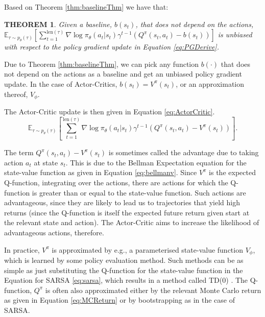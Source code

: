 \documentclass{report}
\newtheorem{theorem}{THEOREM}
\numberwithin{equation}{section}
\numberwithin{figure}{section}
\numberwithin{table}{section}
\numberwithin{algorithm}{section}
\begin{document}
Based on Theorem \ref{thm:baselineThm} we have that:
\begin{theorem}\label{thm:unbiasedBaseline}
  Given a baseline, $b(s_t)$, that does not depend on the actions,\\
  $\mathbb{E}_{\tau\sim p_\theta(\tau)}\left[\sum_{t=1}^{\text{len}(\tau)}\nabla \log \pi_\theta(a_t|s_t)
  \gamma^{t-1}\left(Q^{\pi}(s_t, a_t)-b(s_t)\right)\right]$ is unbiased with respect 
  to the policy gradient update in Equation \ref{eq:PGDerive}.
\end{theorem}
Due to Theorem \ref{thm:baselineThm}, we can pick any function 
$b(\cdot)$ that does not depend on the actions as a baseline and 
get an unbiased policy gradient update. In the case of Actor-Critics, 
$b(s_t)=V^{\pi}(s_t)$, or an approximation thereof, $V_{\phi}$.

The Actor-Critic update is then given in Equation \ref{eq:ActorCritic}.
\begin{equation}\label{eq:ActorCritic}
  \mathbb{E}_{\tau\sim p_\theta(\tau)}\left[\sum_{t=1}^{\text{len}(\tau)}\nabla \log \pi_\theta(a_t|s_t)
  \gamma^{t-1}\left(Q^{\pi}(s_t, a_t)-V^{\pi}(s_t)\right)\right].
\end{equation}

The term $Q^{\pi}(s_t,a_t)-V^{\pi}(s_t)$ is sometimes called the 
advantage due to taking action $a_t$ at state $s_t$. This is 
due to the Bellman Expectation equation for the state-value function 
as given in Equation \ref{eq:bellmanv}. Since $V^{\pi}$ is the 
expected Q-function, integrating over the actions, there are 
actions for which the Q-function is greater than or equal to the 
state-value function. Such actions are advantageous, since they are 
likely to lead us to trajectories that yield high returns (since the 
Q-function is itself the expected future return given start at 
the relevant state and action). The Actor-Critic aims to 
increase the likelihood of advantageous actions, therefore.

In practice, $V^{\pi}$ is approximated by e.g., a parameterised 
state-value function $V_\phi$, which is learned by some policy 
evaluation method. Such methods can be as simple as just 
substituting the Q-function for the state-value function 
in the Equation for SARSA \ref{eq:sarsa}, which results in 
a method called TD(0) \citep{SuttonTD}. 
The Q-function, $Q^{\pi}$ is often also approximated 
either by the relevant Monte Carlo return as given in Equation 
\ref{eq:MCReturn} or by bootstrapping as in the 
case of SARSA.
\end{document}
